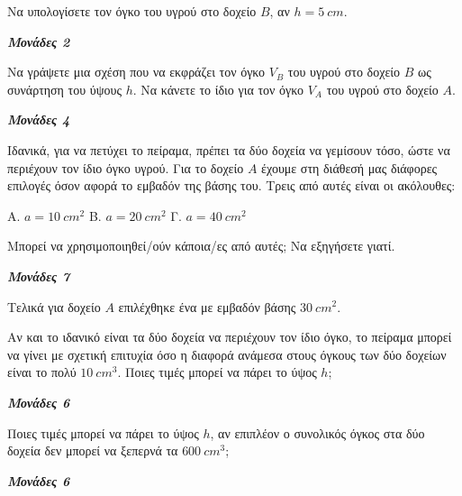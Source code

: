 \documentclass[11pt,a4paper,twoside]{book}
\newcommand{\monades}[1]{
\hspace*{\fill}
\textbf{\textit{\textcolor{maincolor}{Μονάδες #1}}}}
\begin{document}
\begin{center}

\end{center}

\begin{alist}
\item

\begin{rlist}
\item Να υπολογίσετε τον όγκο του υγρού στο δοχείο $B$, αν $h = 5\ cm$.
\monades{2}
\item Να γράψετε μια σχέση που να εκφράζει τον όγκο $V_{B}$ του υγρού στο δοχείο $B$ ως συνάρτηση του ύψους $h$. Να κάνετε το ίδιο για τον όγκο $V_{A}$ του υγρού στο δοχείο $A$.
\monades{4}
\end{rlist}
\item Ιδανικά, για να πετύχει το πείραμα, πρέπει τα δύο δοχεία να γεμίσουν τόσο, ώστε να περιέχουν τον ίδιο όγκο υγρού. Για το δοχείο $A$ έχουμε στη διάθεσή μας διάφορες επιλογές όσον αφορά το εμβαδόν της βάσης του. Τρεις από αυτές είναι οι ακόλουθες:

Α. $a = 10\ cm^{2}$ \quad Β. $a = 20\ cm^{2}$ \quad Γ. $a = 40\ cm^{2}$

Μπορεί να χρησιμοποιηθεί/ούν κάποια/ες από αυτές; Να εξηγήσετε γιατί.
\monades{7}
\item Τελικά για δοχείο $A$ επιλέχθηκε ένα με εμβαδόν βάσης $30\ cm^{2}$.

\begin{rlist}
\item Αν και το ιδανικό είναι τα δύο δοχεία να περιέχουν τον ίδιο όγκο, το πείραμα μπορεί να γίνει με σχετική επιτυχία όσο η διαφορά ανάμεσα στους όγκους των δύο δοχείων είναι το πολύ $10\ cm^{3}$. Ποιες τιμές μπορεί να πάρει το ύψος $h$;
\monades{6}
\item Ποιες τιμές μπορεί να πάρει το ύψος $h$, αν επιπλέον ο συνολικός όγκος στα δύο δοχεία δεν μπορεί να ξεπερνά τα $600\ cm^{3}$;
\monades{6}
\end{rlist}
\end{alist}
\end{document}
